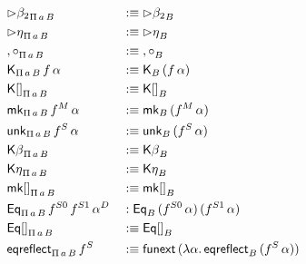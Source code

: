 \documentclass[acmsmall,review]{acmart}\settopmatter{printfolios=true,printccs=false,printacmref=false}
\begin{document}
{\begin{alignat*}{5}
  & {\rhd\beta_2}_{\Pi\,a\,B}  && :\equiv {\rhd\beta_2}_B \\
  & {\rhd\eta}_{\Pi\,a\,B}  && :\equiv {\rhd\eta}_B \\
  & {,\circ}_{\Pi\,a\,B}  && :\equiv {,\circ}_B \\
  & \mathsf{K}_{\Pi\,a\,B}\,f\,\alpha  && :\equiv \mathsf{K}_B\,(f\,\alpha) \\
  & {\mathsf{K}[]}_{\Pi\,a\,B}  && :\equiv {\mathsf{K}[]}_B \\
  & \mathsf{mk}_{\Pi\,a\,B}\,f^M\,\alpha && :\equiv \mathsf{mk}_B\,(f^M\,\alpha)\\
  & \mathsf{unk}_{\Pi\,a\,B}\,f^S\,\alpha  && :\equiv \mathsf{unk}_B\,(f^S\,\alpha) \\
  & {\mathsf{K}\beta}_{\Pi\,a\,B}  && :\equiv {\mathsf{K}\beta}_B \\
  & {\mathsf{K}\eta}_{\Pi\,a\,B}  && :\equiv {\mathsf{K}\eta}_B \\
  & {\mathsf{mk}[]}_{\Pi\,a\,B}  && :\equiv {\mathsf{mk}[]}_B \\
  & \mathsf{Eq}_{\Pi\,a\,B}\,f^{S0}\,f^{S1}\,\alpha^D  && : \mathsf{Eq}_B\,(f^{S0}\,\alpha)\,(f^{S1}\,\alpha) \\
  & {\mathsf{Eq}[]}_{\Pi\,a\,B} && :\equiv {\mathsf{Eq}[]}_B \\
  & \mathsf{eqreflect}_{\Pi\,a\,B}\,f^S && :\equiv \mathsf{funext}\,(\lambda\alpha.\,\mathsf{eqreflect}_B\,(f^S\,\alpha))
\end{alignat*}
}
\end{document}
